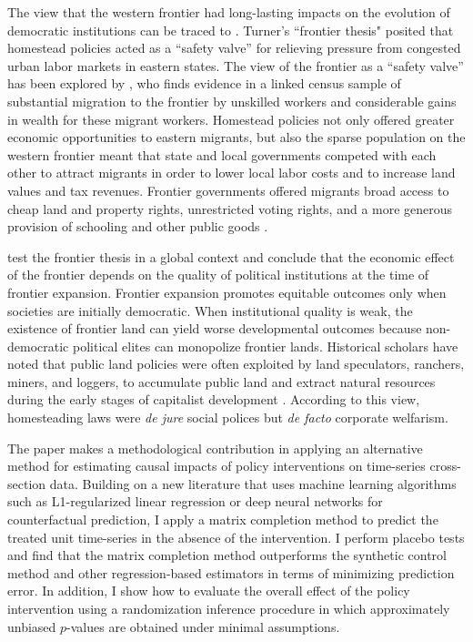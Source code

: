The view that the western frontier had long-lasting impacts on the evolution of democratic institutions can be traced to \citet{turner1956significance}. Turner's ``frontier thesis" posited that homestead policies acted as a ``safety valve'' for relieving pressure from congested urban labor markets in eastern states. The view of the frontier as a ``safety valve'' has been explored by \citet{ferrie1997migration}, who finds evidence in a linked census sample of substantial migration to the frontier by unskilled workers and considerable gains in wealth for these migrant workers. Homestead policies not only offered greater economic opportunities to eastern migrants, but also the sparse population on the western frontier meant that state and local governments competed with each other to attract migrants in order to lower local labor costs and to increase land values and tax revenues. Frontier governments offered migrants broad access to cheap land and property rights, unrestricted voting rights, and a more generous provision of schooling and other public goods \citep{engerman2005evolution}.

\citet{garcia2008myth} test the frontier thesis in a global context and conclude that the economic effect of the frontier depends on the quality of political institutions at the time of frontier expansion. Frontier expansion promotes equitable outcomes only when societies are initially democratic. When institutional quality is weak, the existence of frontier land can yield worse developmental outcomes because non-democratic political elites can monopolize frontier lands. Historical scholars have noted that public land policies were often exploited by land speculators, ranchers, miners, and loggers, to accumulate public land and extract natural resources during the early stages of capitalist development \citep{gates1942role,murtazashvili2013political}. According to this view, homesteading laws were \emph{de jure} social polices but \emph{de facto} corporate welfarism. 

The paper makes a methodological contribution in applying an alternative method for estimating causal impacts of policy interventions on time-series cross-section data. Building on a new literature that uses machine learning algorithms such as L1-regularized linear regression \citep{doudchenko2016balancing} or deep neural networks \citep{poulos2017rnn} for counterfactual prediction, I apply a matrix completion method to predict the treated unit time-series in the absence of the intervention. I perform placebo tests and find that the matrix completion method outperforms the synthetic control method and other regression-based estimators in terms of minimizing prediction error. In addition, I show how to evaluate the overall effect of the policy intervention using a randomization inference procedure in which approximately unbiased $p$-values are obtained under minimal assumptions.

